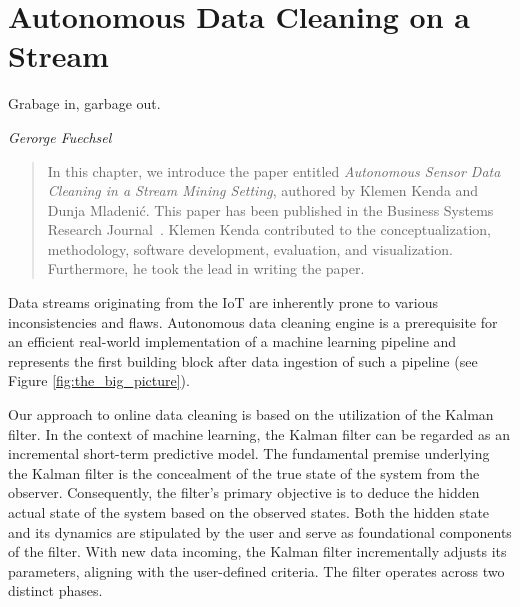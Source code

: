 \chapter{Autonomous Data Cleaning on a Stream}
\label{ch:data-cleaning}

\epigraph{Grabage in, garbage out.}{\textit{Gerorge Fuechsel}}

\begin{quote}
In this chapter, we introduce the paper entitled \textit{Autonomous Sensor Data Cleaning in a Stream Mining Setting}, authored by Klemen Kenda and Dunja Mladenić. 
This paper has been published in the Business Systems Research Journal~\cite{kenda:2018:autonomous}.
Klemen Kenda contributed to the conceptualization, methodology, software development, evaluation, and visualization.
Furthermore, he took the lead in writing the paper.
\end{quote}

Data streams originating from the IoT are inherently prone to various inconsistencies and flaws.
Autonomous data cleaning engine is a prerequisite for an efficient real-world implementation of a machine learning pipeline and represents the first building block after data ingestion of such a pipeline (see Figure \ref{fig:the_big_picture}).

Our approach to online data cleaning is based on the utilization of the Kalman filter. 
In the context of machine learning, the Kalman filter can be regarded as an incremental short-term predictive model.
The fundamental premise underlying the Kalman filter is the concealment of the true state of the system from the observer.
Consequently, the filter's primary objective is to deduce the hidden actual state of the system based on the observed states.
Both the hidden state and its dynamics are stipulated by the user and serve as foundational components of the filter.
With new data incoming, the Kalman filter incrementally adjusts its parameters, aligning with the user-defined criteria. 
The filter operates across two distinct phases.

